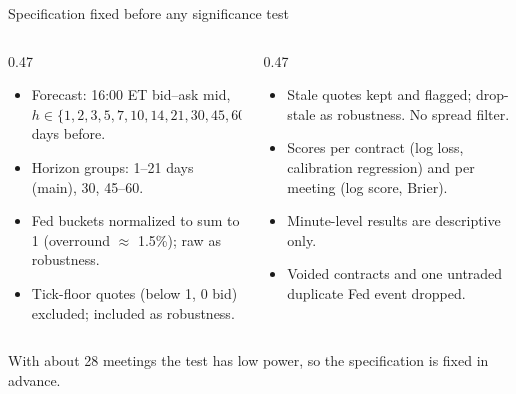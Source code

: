 \documentclass[aspectratio=169, 11pt, t]{beamer}
\begin{document}
\begin{frame}{Specification fixed before any significance test}
  \begin{columns}[T]
    \begin{column}{0.47\textwidth}
      \begin{itemize}\footnotesize
        \item Forecast: 16:00 ET bid--ask mid, $h \in \{1,2,3,5,7,10,14,21,30,45,60\}$ days before.
        \item Horizon groups: 1--21 days (main), 30, 45--60.
        \item Fed buckets normalized to sum to 1 (overround $\approx$ 1.5\%); raw as robustness.
        \item Tick-floor quotes (below 1\textcent, 0\textcent{} bid) excluded; included as robustness.
      \end{itemize}
    \end{column}
    \begin{column}{0.47\textwidth}
      \begin{itemize}\footnotesize
        \item Stale quotes kept and flagged; drop-stale as robustness. No spread filter.
        \item Scores per contract (log loss, calibration regression) and per meeting (log score, Brier).
        \item Minute-level results are descriptive only.
        \item Voided contracts and one untraded duplicate Fed event dropped.
      \end{itemize}
    \end{column}
  \end{columns}
  \vspace{10pt}
  {\footnotesize\color{sloangray}With about 28 meetings the test has low power, so the specification is fixed in advance.\par}
\end{frame}
\end{document}
